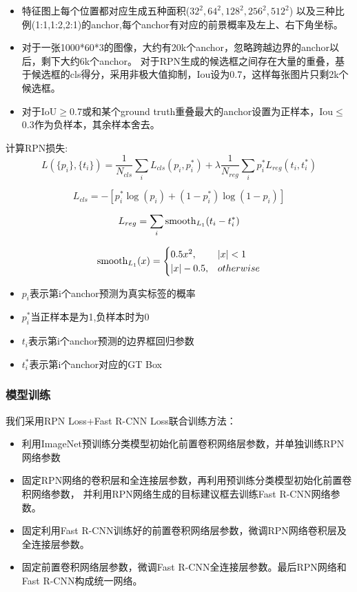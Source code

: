 \documentclass[UTF8]{ctexart}
\begin{document}
\begin{itemize}
    \item 特征图上每个位置都对应生成五种面积($32^2,64^2,128^2,256^2,512^2$)
    以及三种比例(1:1,1:2,2:1)的anchor,每个anchor有对应的前景概率及左上、右下角坐标。
    \item 对于一张1000*60*3的图像，大约有20k个anchor，忽略跨越边界的anchor以后，剩下大约6k个anchor。
    对于RPN生成的候选框之间存在大量的重叠，基于候选框的cls得分，采用非极大值抑制，Iou设为0.7，这样每张图片只剩2k个候选框。
    \item 对于IoU$\ge$0.7或和某个ground truth重叠最大的anchor设置为正样本，Iou$\le$0.3作为负样本，其余样本舍去。 
\end{itemize}

计算RPN损失:
$$L(\{p_i\},\{t_i\})=\frac{1}{N_{cls}}\sum_iL_{cls}(p_i,p_i^*)+\lambda\frac{1}{N_{reg}}\sum_ip_i^*L_{reg}(t_i,t_i^*) $$

$$L_{cls}=-[p_i^* \log (p_i)+(1-p_i^*) \log (1-p_i)]$$

$$L_{reg}=\sum_i{\rm smooth}_{L_1}(t_i-t_i^*)$$


\begin{equation}
{\rm smooth}_{L_1}(x)=
\begin{cases}
0.5x^2,& |x|<1\\
|x|-0.5,& otherwise
\end{cases}
\end{equation}

\begin{itemize}
    \item $p_i$表示第i个anchor预测为真实标签的概率
    \item $p_i^*$当正样本是为1,负样本时为0
    \item $t_i$表示第i个anchor预测的边界框回归参数
    \item $t_i^*$表示第i个anchor对应的GT Box
\end{itemize}

\subsubsection{模型训练}

我们采用RPN Loss+Fast R-CNN Loss联合训练方法：
\begin{itemize}
    \item 利用ImageNet预训练分类模型初始化前置卷积网络层参数，并单独训练RPN网络参数
    \item 固定RPN网络的卷积层和全连接层参数，再利用预训练分类模型初始化前置卷积网络参数，
    并利用RPN网络生成的目标建议框去训练Fast R-CNN网络参数。
    \item 固定利用Fast R-CNN训练好的前置卷积网络层参数，微调RPN网络卷积层及全连接层参数。
    \item 固定前置卷积网络层参数，微调Fast R-CNN全连接层参数。最后RPN网络和Fast R-CNN构成统一网络。
\end{itemize}
\end{document}
